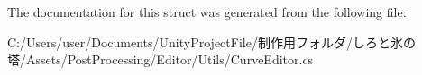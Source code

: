 The documentation for this struct was generated from the following file\+:\begin{DoxyCompactItemize}
\item 
C\+:/\+Users/user/\+Documents/\+Unity\+Project\+File/制作用フォルダ/しろと氷の塔/\+Assets/\+Post\+Processing/\+Editor/\+Utils/Curve\+Editor.\+cs\end{DoxyCompactItemize}
